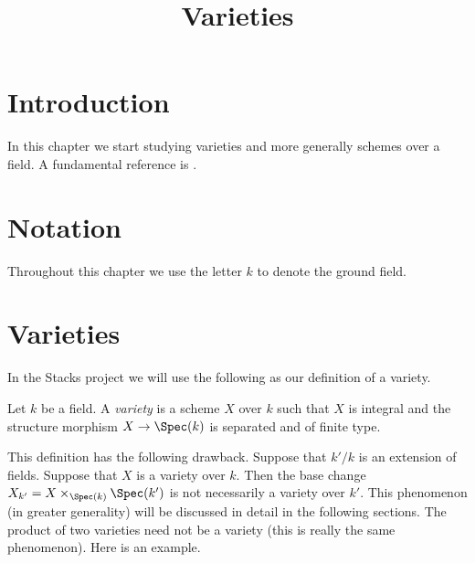 

%


\title{Varieties}


\maketitle

\label{section-phantom}

\tableofcontents

\section{Introduction}
\label{section-introduction}

\noindent
In this chapter we start studying varieties and more generally
schemes over a field. A fundamental reference is \cite{EGA}.








\section{Notation}
\label{section-notation}

\noindent
Throughout this chapter we use the letter $k$ to denote the ground field.










\section{Varieties}
\label{section-varieties}

\noindent
In the Stacks project we will use the following as our definition
of a variety.

\begin{definition}
\label{definition-variety}
Let $k$ be a field. A {\it variety} is a scheme $X$ over $k$
such that $X$ is integral and the structure morphism
$X \to \Spec(k)$ is separated and of finite type.
\end{definition}

\noindent
This definition has the following drawback. Suppose that
$k'/k$ is an extension of fields. Suppose that $X$
is a variety over $k$. Then the base change
$X_{k'} = X \times_{\Spec(k)} \Spec(k')$ is
not necessarily a variety over $k'$. This phenomenon (in greater
generality) will be discussed in detail in the following sections.
The product of two varieties need not be a variety
(this is really the same phenomenon). Here is an example.

